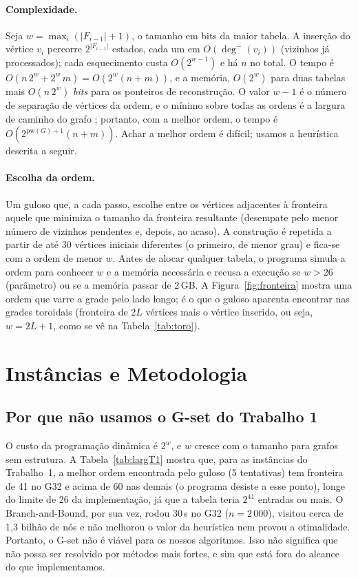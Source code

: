 \paragraph{Complexidade.} Seja $w=\max_i(|F_{i-1}|+1)$, o tamanho em bits da maior tabela. A inserção do vértice $v_i$ percorre $2^{|F_{i-1}|}$ estados, cada um em $O(\deg^-(v_i))$ (vizinhos já processados); cada esquecimento custa $O(2^{w-1})$ e há $n$ no total. O tempo é $O(n\,2^{w}+2^{w}\,m)=O(2^{w}(n+m))$, e a memória, $O(2^{w})$ para duas tabelas mais $O(n\,2^{w})$ \emph{bits} para os ponteiros de reconstrução. O valor $w-1$ é o número de separação de vértices da ordem, e o mínimo sobre todas as ordens é a largura de caminho do grafo \cite{Kinnersley 1992}; portanto, com a melhor ordem, o tempo é $O(2^{\mathrm{pw}(G)+1}(n+m))$. Achar a melhor ordem é difícil; usamos a heurística descrita a seguir.

\paragraph{Escolha da ordem.} Um guloso que, a cada passo, escolhe entre os vértices adjacentes à fronteira aquele que minimiza o tamanho da fronteira resultante (desempate pelo menor número de vizinhos pendentes e, depois, ao acaso). A construção é repetida a partir de até 30 vértices iniciais diferentes (o primeiro, de menor grau) e fica-se com a ordem de menor $w$. Antes de alocar qualquer tabela, o programa simula a ordem para conhecer $w$ e a memória necessária e recusa a execução se $w>26$ (parâmetro) ou se a memória passar de 2\,GB. A Figura~\ref{fig:fronteira} mostra uma ordem que varre a grade pelo lado longo; é o que o guloso aparenta encontrar nas grades toroidais (fronteira de $2L$ vértices mais o vértice inserido, ou seja, $w=2L+1$, como se vê na Tabela~\ref{tab:toro}).

\section{Instâncias e Metodologia}\label{sec:instancias}

\subsection{Por que não usamos o G-set do Trabalho 1}

O custo da programação dinâmica é $2^{w}$, e $w$ cresce com o tamanho para grafos sem estrutura. A Tabela~\ref{tab:largT1} mostra que, para as instâncias do Trabalho~1, a melhor ordem encontrada pelo guloso (5 tentativas) tem fronteira de 41 no G32 e acima de 60 nas demais (o programa desiste a esse ponto), longe do limite de 26 da implementação, já que a tabela teria $2^{41}$ entradas ou mais. O Branch-and-Bound, por sua vez, rodou 30\,s no G32 ($n=2\,000$), visitou cerca de 1,3 bilhão de nós e não melhorou o valor da heurística nem provou a otimalidade. Portanto, o G-set não é viável para os nossos algoritmos. Isso não significa que não possa ser resolvido por métodos mais fortes, e sim que está fora do alcance do que implementamos.

